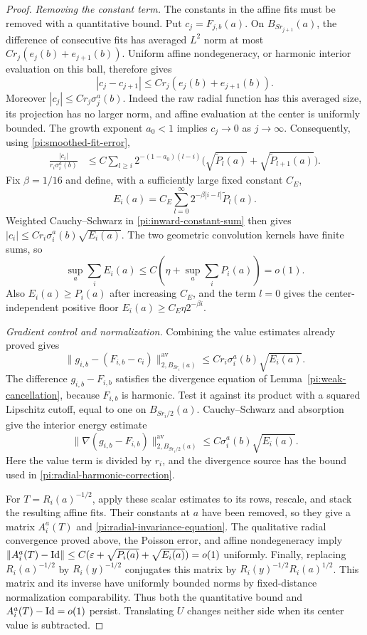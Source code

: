 \begin{proof}
\smallskip\noindent
\emph{Removing the constant term.}
The constants in the affine fits must be removed with a quantitative
bound.  Put $c_j=F_{j,b}(a)$.  On $B_{Sr_{j+1}}(a)$,
the difference of consecutive fits has averaged $L^2$ norm at
most $Cr_j(e_j(b)+e_{j+1}(b))$.  Uniform affine nondegeneracy,
or harmonic interior evaluation on this ball, therefore gives
\[
 |c_j-c_{j+1}|\le Cr_j(e_j(b)+e_{j+1}(b)).
\]
Moreover $|c_j|\le Cr_j\sigma_j^a(b)$.  Indeed the raw radial
function has this averaged size, its projection has no larger
norm, and affine evaluation at the center is uniformly bounded.
The growth exponent $a_0<1$ implies $c_j\to0$ as $j\to\infty$.
Consequently, using \eqref{pi:smoothed-fit-error},
\begin{align}
 \frac{|c_i|}{r_i\sigma_i^a(b)}
 &\le C\sum_{l\ge i}2^{-(1-a_0)(l-i)}
       \bigl(\sqrt{\widetilde P_l(a)}
                +\sqrt{\widetilde P_{l+1}(a)}\bigr).
 \label{pi:inward-constant-sum}
\end{align}
Fix $\beta=1/16$ and define, with a sufficiently large fixed
constant $C_E$,
\begin{equation}
 E_i(a)=C_E\sum_{l=0}^\infty
                  2^{-\beta|i-l|}\widetilde P_l(a).
 \label{pi:definition-E}
\end{equation}
Weighted Cauchy--Schwarz in \eqref{pi:inward-constant-sum}
then gives $|c_i|\le Cr_i\sigma_i^a(b)\sqrt{E_i(a)}$.
The two geometric convolution kernels have finite sums, so
\[
 \sup_a\sum_iE_i(a)
 \le C\left(\eta+\sup_a\sum_iP_i(a)\right)=o(1).
\]
Also $E_i(a)\ge P_i(a)$ after increasing $C_E$, and the term
$l=0$ gives the center-independent positive floor
$E_i(a)\ge C_E\eta2^{-\beta i}$.

\smallskip\noindent
\emph{Gradient control and normalization.}
Combining the value estimates already proved gives
\[
 \|g_{i,b}-(F_{i,b}-c_i)\|_{2,B_{Sr_i}(a)}^{\mathrm{av}}
 \le Cr_i\sigma_i^a(b)\sqrt{E_i(a)}.
\]
The difference $g_{i,b}-F_{i,b}$ satisfies the divergence equation
of Lemma~\ref{pi:weak-cancellation}, because $F_{i,b}$ is harmonic.
Test it against its product with a squared Lipschitz cutoff,
equal to one on $B_{Sr_i/2}(a)$.  Cauchy--Schwarz and absorption
give the interior energy estimate
\[
 \|\nabla(g_{i,b}-F_{i,b})\|_{2,B_{Sr_i/2}(a)}^{\mathrm{av}}
 \le C\sigma_i^a(b)\sqrt{E_i(a)}.
\]
Here the value term is divided by $r_i$, and the divergence source
has the bound used in \eqref{pi:radial-harmonic-correction}.

For $T=R_i(a)^{-1/2}$, apply these scalar estimates to its rows,
rescale, and stack the resulting affine fits.  Their constants
at $a$ have been removed, so they give a matrix $A_i^a(T)$ and
\eqref{pi:radial-invariance-equation}.  The qualitative radial
convergence proved above, the Poisson error, and affine
nondegeneracy imply
$\|A_i^a(T)-\mathrm{Id}\|\le C(\varepsilon+\sqrt{P_i(a)}+
\sqrt{E_i(a)})=o(1)$ uniformly.  Finally, replacing
$R_i(a)^{-1/2}$ by $R_i(y)^{-1/2}$ conjugates this matrix by
$R_i(y)^{-1/2}R_i(a)^{1/2}$.  This matrix and its inverse have
uniformly bounded norms by fixed-distance normalization
comparability.  Thus both the quantitative bound and
$A_i^a(T)-\mathrm{Id}=o(1)$ persist.  Translating $U$ changes neither
side when its center value is subtracted.
\end{proof}

